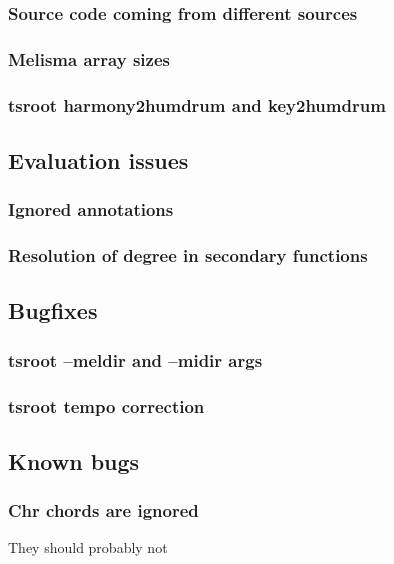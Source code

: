 		\subsubsection{Source code coming from different sources}
		\subsubsection{Melisma array sizes}
		\subsubsection{tsroot harmony2humdrum and key2humdrum}
	\subsection{Evaluation issues}
		\subsubsection{Ignored annotations}
		\subsubsection{Resolution of degree in secondary functions}
	\subsection{Bugfixes}
		\subsubsection{tsroot --meldir and --midir args}
		\subsubsection{tsroot tempo correction}
	\subsection{Known bugs}
		\subsubsection{Chr chords are ignored}
    They should probably not

\newpage
